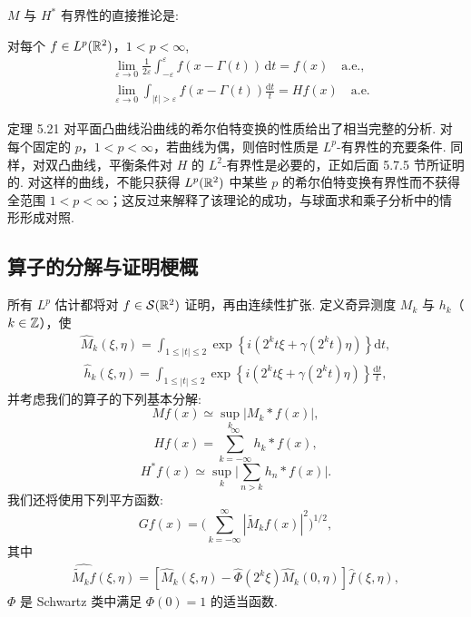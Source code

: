 $M$ 与 $H^{*}$ 有界性的直接推论是:

\begin{corollary}\label{cor:5.22}
对每个 $f \in L^p(\mathbb{R}^2)$，$1 < p < \infty$,
\begin{align*}
  &\lim_{\varepsilon\rightarrow 0}\frac{1}{2\varepsilon}\int_{-\varepsilon}^{\varepsilon}f(x-\Gamma(t))\,\mathrm{d}t=f(x)\quad\text{a.e.},\\
  &\lim_{\varepsilon\rightarrow 0}\int_{|t|>\varepsilon}f(x-\Gamma(t))\frac{\mathrm{d}t}{t}=H f(x)\quad\text{a.e.}
\end{align*}
\end{corollary}

定理 5.21 对平面凸曲线沿曲线的希尔伯特变换的性质给出了相当完整的分析. 对每个固定的 $p$，$1 < p < \infty$，若曲线为偶，则倍时性质是 $L^p$-有界性的充要条件. 同样，对双凸曲线，平衡条件对 $H$ 的 $L^2$-有界性是必要的，正如后面 5.7.5 节所证明的. 对这样的曲线，不能只获得 $L^p(\mathbb{R}^2)$ 中某些 $p$ 的希尔伯特变换有界性而不获得全范围 $1 < p < \infty$；这反过来解释了该理论的成功，与球面求和乘子分析中的情形形成对照.

\subsection{算子的分解与证明梗概}

所有 $L^p$ 估计都将对 $f \in \mathcal{S}(\mathbb{R}^2)$ 证明，再由连续性扩张. 定义奇异测度 $M_k$ 与 $h_k$（$k \in \mathbb{Z}$），使
\begin{align*}
  \widehat{M}_{k}(\xi,\eta)=\int_{1\leq|t|\leq 2}\exp\left\{i(2^{k}t\xi+\gamma(2^{k}t)\eta)\right\}\mathrm{d}t,
\end{align*}
\begin{align*}
  \widehat{h}_{k}(\xi,\eta)=\int_{1\leq|t|\leq 2}\exp\left\{i(2^{k}t\xi+\gamma(2^{k}t)\eta)\right\}\frac{\mathrm{d}t}{t},
\end{align*}
并考虑我们的算子的下列基本分解:
\begin{equation}\label{eq:5.10}
  Mf(x)\simeq\sup_{k}|M_{k}*f(x)|,
\end{equation}
\begin{equation}\label{eq:5.11}
  H f(x)=\sum_{k=-\infty}^{\infty}h_{k}*f(x),
\end{equation}
\begin{equation}\label{eq:5.12}
  H^{*}f(x)\simeq\sup_{k}\Big|\sum_{n>k}h_{n}*f(x)\Big|.
\end{equation}
我们还将使用下列平方函数:
\begin{equation}\label{eq:5.13}
  G f(x)=\Big(\sum_{k=-\infty}^{\infty}|\widetilde{M}_{k}f(x)|^{2}\Big)^{1/2},
\end{equation}
其中
\begin{align*}
  \widehat{\widetilde{M}_{k}f}(\xi,\eta)=\left[\widehat{M}_{k}(\xi,\eta)-\widehat{\Phi}(2^{k}\xi)\widehat{M}_{k}(0,\eta)\right]\widehat{f}(\xi,\eta),
\end{align*}
$\Phi$ 是 Schwartz 类中满足 $\Phi(0) = 1$ 的适当函数.

